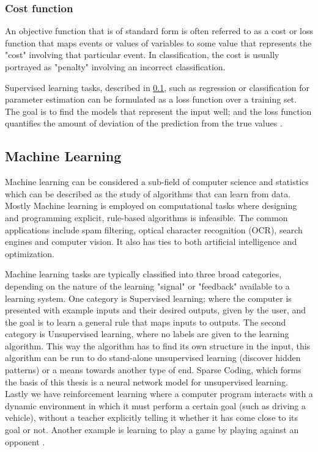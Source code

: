 \subsubsection{Cost function}

An objective function that is of standard form is often referred to as a cost or loss function that maps events or values of variables to some value that represents the "cost" involving that particular event. In classification, the cost is usually portrayed as "penalty" involving an incorrect classification. 

Supervised learning tasks, described in \ref{sec:ml}, such as regression or classification for parameter estimation can be formulated as a loss function over a training set. The goal is to find the models that represent the input well; and the loss function quantifies the amount of deviation of the prediction from the true values \cite{convex}.

\subsection{Machine Learning}
\label{sec:ml}
Machine learning can be considered a sub-field of computer science and statistics which can be described as the study of algorithms that can learn from data. Mostly Machine learning is employed on computational tasks where designing and programming explicit, rule-based algorithms is infeasible. The common applications include spam filtering, optical character recognition (OCR), search engines and computer vision. It also has ties to both artificial intelligence and optimization.

Machine learning tasks are typically classified into three broad categories, depending on the nature of the learning "signal" or "feedback" available to a learning system. One category is Supervised learning; where the computer is presented with example inputs and their desired outputs, given by the user, and the goal is to learn a general rule that maps inputs to outputs. The second category is Unsupervised learning, where no labels are given to the learning algorithm. This way the algorithm has to find its own structure in the input, this algorithm can be run to do stand-alone unsupervised learning (discover hidden patterns) or a means towards another type of end. Sparse Coding, which forms the basis of this thesis is a neural network model for unsupervised learning. Lastly we have reinforcement learning where a computer program interacts with a dynamic environment in which it must perform a certain goal (such as driving a vehicle), without a teacher explicitly telling it whether it has come close to its goal or not. Another example is learning to play a game by playing against an opponent \cite{ainorvig}.

